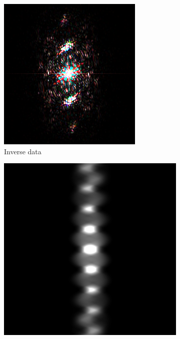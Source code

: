 \begin{figure}[H]
    \centering
    \begin{subfigure}{0.47\columnwidth}
        \centering
        \includegraphics[width=\columnwidth]{figures/expantion fourie transform magnified.png}
        \caption{Inverse data}
        \label{fig:expansion fourie transform magnified}
    \end{subfigure}
    \centering
    \begin{subfigure}{0.49\columnwidth}
        \centering
        \includegraphics[width=\columnwidth]{figures/reverse fourie transform.png}

\end{subfigure}
\end{figure}
